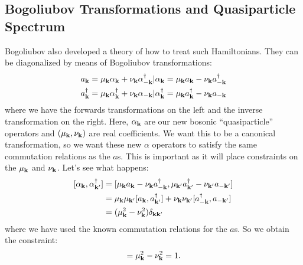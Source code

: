 \subsection{Bogoliubov Transformations and Quasiparticle Spectrum}
Bogoliubov also developed a theory of how to treat such Hamiltonians. They can be diagonalized by means of Bogoliubov transformations:
\begin{equation}
    \begin{split}
        a_{\mathbf{k}} &= \mu_{\mathbf{k}}\alpha_{\mathbf{k}} + \nu_{\mathbf{k}}\alpha^\dagger_{-\mathbf{k}} \vert \alpha_{\mathbf{k}} = \mu_{\mathbf{k}}a_{\mathbf{k}} - \nu_{\mathbf{k}}a^\dagger_{-\mathbf{k}}
        \\ a_{\mathbf{k}}^\dagger &= \mu_{\mathbf{k}}\alpha_{\mathbf{k}}^\dagger + \nu_{\mathbf{k}}\alpha_{-\mathbf{k}} \vert \alpha_{\mathbf{k}}^\dagger = \mu_{\mathbf{k}}a^\dagger_{\mathbf{k}} - \nu_{\mathbf{k}}a_{-\mathbf{k}}
    \end{split}
\end{equation}
where we have the forwards transformations on the left and the inverse transformation on the right. Here, $\alpha_{\mathbf{k}}$ are our new bosonic ``quasiparticle'' operators and $(\mu_{\mathbf{k}}, \nu_{\mathbf{k}})$ are real coefficients. We want this to be a canonical transformation, so we want these new $\alpha$ operators to satisfy the same commutation relations as the $a$s. This is important as it will place constraints on the $\mu_{\mathbf{k}}$ and $\nu_{\mathbf{k}}$. Let's see what happens:
\begin{equation}
    \begin{split}
        [\alpha_{\mathbf{k}}, \alpha^\dagger_{\mathbf{k}'}] &= [\mu_{\mathbf{k}}a_{\mathbf{k}} - \nu_{\mathbf{k}}a^\dagger_{-\mathbf{k}}, \mu_{\mathbf{k}'}a^\dagger_{\mathbf{k}'} - \nu_{\mathbf{k}'}a_{-\mathbf{k}'}]
    \\ &= \mu_{\mathbf{k}}\mu_{\mathbf{k}'}[a_{\mathbf{k}}, a^\dagger_{\mathbf{k}'}] + \nu_{\mathbf{k}}\nu_{\mathbf{k}'}[a^\dagger_{-\mathbf{k}}, a_{-\mathbf{k}'}]
    \\ &= (\mu_{\mathbf{k}}^2 - \nu_{\mathbf{k}}^2)\delta_{\mathbf{k}\mathbf{k}'}
    \end{split}
\end{equation}
where we have used the known commutation relations for the $a$s. So we obtain the constraint:
\begin{equation}
    [\alpha_\v{k}, \alpha^\dag_{\v{k}'}] = \mu_{\v{k}}^2 - \nu_{\v{k}}^2 = 1.
\end{equation}

